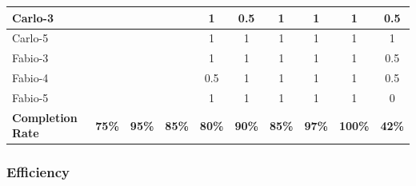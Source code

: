 \begin{tabularx}{\linewidth}{l|c|c|c|c|c|c|c|c|c}
        Carlo-3 &  &  &  & 1 & 0.5 & 1 & 1 & 1 & 0.5 \\ \midrule
        Carlo-5 &  &  &  & 1 & 1 & 1 & 1 & 1 & 1 \\ \midrule
        Fabio-3 &  &  &  & 1 & 1 & 1 & 1 & 1 & 0.5 \\ \midrule
        Fabio-4 &  &  &  & 0.5 & 1 & 1 & 1 & 1 & 0.5 \\ \midrule
        Fabio-5 &  &  &  & 1 & 1 & 1 & 1 & 1 & 0 \\ \midrule
        \textbf{Completion Rate} & \textbf{75\%} & \textbf{95\%} & \textbf{85\%} & \textbf{80\%} & \textbf{90\%} & \textbf{85\%} & \textbf{97\%} & \textbf{100\%} & \textbf{42\%}
    \end{tabularx}

\subsubsection{Efficiency}
